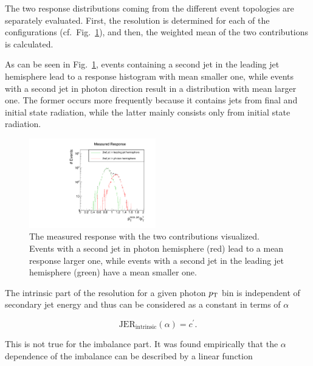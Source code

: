 The two response distributions coming from the different event topologies are separately evaluated. First, the resolution is determined for each of the configurations 
(\mbox{cf. Fig. \ref{fig:fullResponseAndContributions}}), and then, the 
weighted mean of the two contributions is calculated.

As can be seen in \mbox{Fig. \ref{fig:fullResponseAndContributions}}, 
events containing a second jet in the leading jet hemisphere lead to a response histogram with mean smaller one, 
while events with a second jet in photon direction result in a distribution with mean larger one. 
The former occurs more frequently because it contains jets from final and initial state radiation, while
the latter mainly consists only from initial state radiation.

\begin{figure}[tbp]
  \centering

      \includegraphics[width=0.49\textwidth]{figures/resolution/methodology/fullResponseAndContributionsExample.pdf}
 
  \caption{The measured response with the two contributions visualized. Events with a second jet in photon hemisphere (red) lead to a mean response larger one, while events with a
           second jet in the leading jet hemisphere (green) have a mean smaller one.}  
  \label{fig:fullResponseAndContributions}
\end{figure}

The intrinsic part of the resolution for a given photon $p_{\text{T}}$ bin is independent of secondary jet energy and thus can be considered as a constant in terms of $\alpha$

\begin{equation}\label{eq:intrinsic}
  \text{JER}_{\text{intrinsic}} \left( \alpha\right) = c^{\prime}.
\end{equation}

This is not true for the imbalance part. It was found empirically that the $\alpha$ dependence of the imbalance can be described by a linear function 

